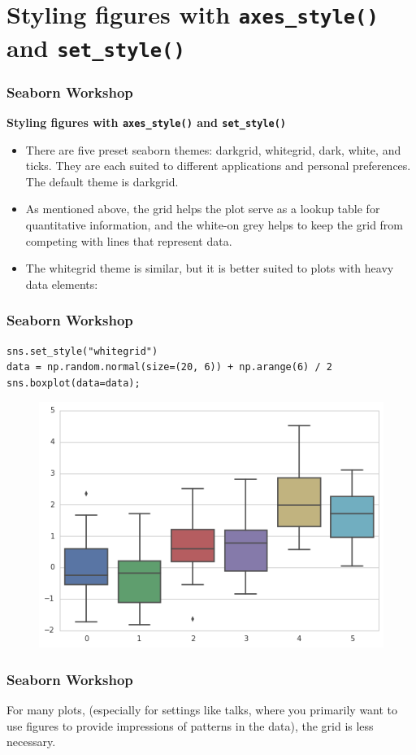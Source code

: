 \documentclass{beamer}
\begin{document}
\section{Styling figures with \texttt{axes\_style()} and \texttt{set\_style()}}
\begin{frame}[fragile]
	\frametitle{Seaborn Workshop}
	\large
\textbf{Styling figures with \texttt{axes\_style()} and \texttt{set\_style()}}
\begin{itemize}
\item
There are five preset seaborn themes: darkgrid, whitegrid, dark, white, and ticks. They are each suited to different applications and personal preferences. The default theme is darkgrid.
\item As mentioned above, the grid helps the plot serve as a lookup table for quantitative information, and the white-on grey helps to keep the grid from competing with lines that represent data. 
\item The whitegrid theme is similar, but it is better suited to plots with heavy data elements:
\end{itemize}
\end{frame}
\begin{frame}[fragile]
	\frametitle{Seaborn Workshop}
	\large
\begin{verbatim}
sns.set_style("whitegrid")
data = np.random.normal(size=(20, 6)) + np.arange(6) / 2
sns.boxplot(data=data);
\end{verbatim}
\begin{figure}
\centering
\includegraphics[width=0.7\linewidth]{images/aesthetics_12_0}
\caption{}
\label{fig:aesthetics_12_0}
\end{figure}

\end{frame}
\begin{frame}[fragile]
	\frametitle{Seaborn Workshop}
	\large
For many plots, (especially for settings like talks, where you primarily want to use figures to provide impressions of patterns in the data), the grid is less necessary.
\end{frame}
\end{document}
